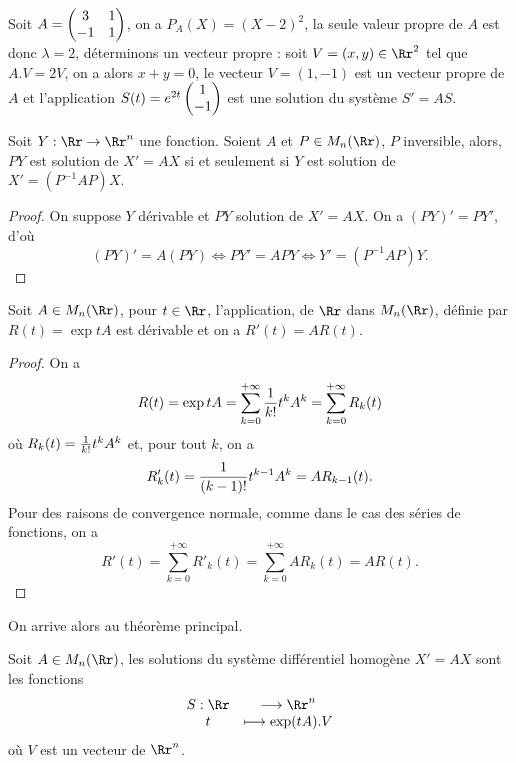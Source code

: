 \documentclass[class=report,crop=false]{standalone}
\begin{document}
\begin{exemple}
Soit $A=\left(\begin{matrix}3&1\cr -1&1\end{matrix}\right)$, 
on a $P_A(X)=(X-2)^2$, la seule valeur propre de $A$ est donc $\lambda=2$, 
déterminons un vecteur propre : soit $V=(x,y)\in\Rr^2$ tel que $A.V=2V$, 
on a alors $x+y=0$, le vecteur $V=(1,-1)$ est un vecteur propre de $A$ 
et l'application $S(t)=e^{2t}\left(\begin{matrix}1\cr-1\end{matrix}\right)$ 
est une solution du système $S'=AS$.
\end{exemple}


\begin{proposition}
Soit $Y : \Rr\rightarrow\Rr^n$ une fonction. Soient $A$ et 
$P\in M_n(\Rr)$, $P$ inversible, alors,
$PY$ est solution de $X'=AX$ si et seulement si $Y$ est solution de $X'=(P^{-1}AP)X$.
\end{proposition} 

\begin{proof}
On suppose $Y$ dérivable et $PY$ solution de $X'=AX$. On a $(PY)'=PY'$, d'où
$$(PY)'=A(PY)\iff PY'=APY\iff Y'=(P^{-1}AP)Y.$$
\end{proof}





\begin{proposition}
Soit $A\in M_n(\Rr)$, pour $t\in\Rr$, l'application,  de $\Rr$ dans
$M_n(\Rr)$, définie par $R(t)=\exp tA$ est dérivable et on a $R'(t)=A R(t)$.
\end{proposition} 

\begin{proof}
On a $$R(t)=\exp tA=\sum_{k=0}^{+\infty}{{1}\over{k!}}t^kA^k=\sum_{k=0}^{+\infty}R_k(t)$$
où $R_k(t)={{1}\over{k!}}t^kA^k$ et, pour tout $k$, on a 
$$R'_k(t)={{1}\over{(k-1)!}}t^{k-1}A^k=AR_{k-1}(t).$$
Pour des raisons de convergence normale, comme dans le cas des séries de fonctions, on a 
$$R'(t)=\sum_{k=0}^{+\infty}R'_k(t)=\sum_{k=0}^{+\infty}AR_k(t)=AR(t).$$
\end{proof}



On arrive alors au théorème principal.


\begin{theoreme}
Soit $A\in M_n(\Rr)$, les solutions du système différentiel homogène $X'=AX$ sont
les fonctions 
$$\begin{array}{cc}S:\Rr &\longrightarrow \Rr^n\cr t&\longmapsto \exp(tA). V\end{array}$$
où $ V$ est un vecteur de $\Rr^n$.
\end{theoreme} 
\end{document}
